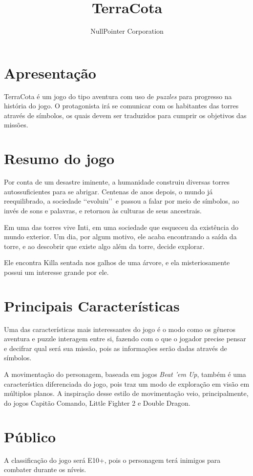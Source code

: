 \documentclass[11pt]{article}
\begin{document}
\title{TerraCota}
\author{NullPointer Corporation}
\date{}
\maketitle

\newpage
\section{Apresentação}
TerraCota é um jogo do tipo aventura com uso de \textit{puzzles} para progresso na história do jogo.  O protagonista irá se comunicar com os habitantes das torres através de símbolos, os quais devem ser traduzidos para cumprir os objetivos das missões.

\section{Resumo do jogo}
Por conta de um desastre iminente, a humanidade construiu diversas torres autossuficientes para se abrigar.
Centenas de anos depois, o mundo já reequilibrado, a sociedade \lq\lq evoluiu\rq\rq\ e passou a falar por meio de símbolos, ao invés de sons e palavras, e retornou às culturas de seus ancestrais.

Em uma das torres vive Inti, em uma sociedade que esqueceu da existência do mundo exterior.  Um dia, por algum motivo, ele acaba encontrando a saída da torre, e ao descobrir que existe algo além da torre, decide explorar.

Ele encontra Killa sentada nos galhos de uma árvore, e ela misteriosamente possui um interesse grande por ele.

\section{Principais Características}
Uma das características mais interessantes do jogo é o modo como os gêneros aventura e puzzle interagem entre si, fazendo com o que o jogador precise pensar e decifrar qual será sua missão, pois as informações serão dadas através de símbolos.

A movimentação do personagem, baseada em jogos \textit{Beat 'em Up}, também é uma característica diferenciada do jogo, pois traz um modo de exploração em visão em múltiplos planos. A inspiração desse estilo de movimentação veio, principalmente, do jogos Capitão Comando, Little Fighter 2 e Double Dragon.

\section{Público}
A classificação do jogo será E10+, pois o personagem terá inimigos para combater durante os níveis.
\end{document}
